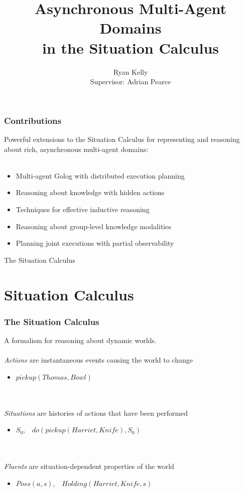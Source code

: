 \documentclass{beamer}
\title{Asynchronous Multi-Agent Domains\\ in the Situation Calculus}
\author[Ryan Kelly]{Ryan Kelly\\ Supervisor: Adrian Pearce}
\begin{document}
\begin{frame}
  \titlepage
\end{frame}

\begin{frame}
  \frametitle{Contributions}
  Powerful extensions to the Situation Calculus for representing and reasoning
  about rich, asynchronous multi-agent domains:
  \ \\
  \ \\
  \begin{itemize}
  \item Multi-agent Golog with distributed execution planning
  \item Reasoning about knowledge with hidden actions
  \item Techniques for effective inductive reasoning
  \item Reasoning about group-level knowledge modalities
  \item Planning joint executions with partial observability
  \end{itemize}
\end{frame}

\begin{frame}
\centering \large The Situation Calculus\\
\end{frame}


\section{Situation Calculus}

\begin{frame}
\frametitle{The Situation Calculus}
A formalism for reasoning about dynamic worlds.
\ \\
\ \\
\emph{Actions} are instantaneous events causing the world to change
\begin{itemize}
  \item $pickup(Thomas,Bowl)$
\end{itemize}
\ \\
\ \\
\emph{Situations} are histories of actions that have been performed
\begin{itemize}
  \item $S_0$,\ \ $do(pickup(Harriet,Knife),S_0)$
\end{itemize}
\ \\
\ \\
\emph{Fluents} are situation-dependent properties of the world
\begin{itemize}
  \item $Poss(a,s)$,\ \ $Holding(Harriet,Knife,s)$
\end{itemize}
\end{frame}
\end{document}
